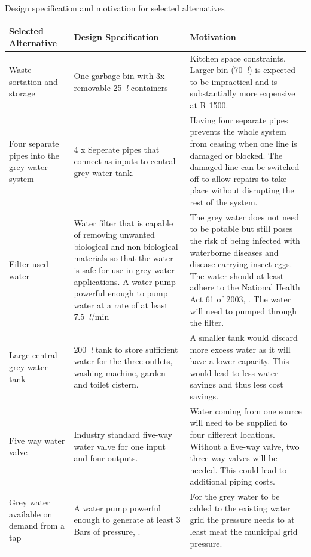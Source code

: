 \documentclass[a4paper,11pt,fleqn]{report}
\begin{document}
\begin{center}
\caption {Design specification and motivation for selected alternatives} \label{tb: Functional_design_specs} 
\begin{longtable}{p{3cm}|p{5.5cm}|p{5.5cm}}\toprule
	{\textbf{Selected Alternative}} & {\textbf{Design Specification}} & {\textbf{Motivation}}\\ \midrule
    \hline
    Waste sortation and storage & One garbage bin with 3x removable 25~\textit{l} containers & 
Kitchen space constraints. Larger bin (70~\textit{l}) is expected to be impractical and is substantially more expensive at R 1500.\\
        \hline
    Four separate pipes into the grey water system & 4 x Seperate pipes that connect as inputs to central grey water tank. & Having four separate pipes prevents the whole system from ceasing when one line is damaged or blocked. The damaged line can be switched off to allow repairs to take place without disrupting the rest of the system.\\
        \hline
    Filter used water & Water filter that is capable of removing unwanted biological and non biological materials so that the water is safe for use in grey water applications.
A water pump powerful enough to pump water at a rate of at least 7.5~\textit{l}/min
 & The grey water does not need to be potable but still poses the risk of being infected with waterborne diseases and disease carrying insect eggs. The water should at least adhere to the National Health Act 61 of 2003, \citep{NHA2003}.
The water will need to pumped through the filter.\\
        \hline
    Large central grey water tank & 200~\textit{l} tank to store sufficient water for the three outlets, washing machine, garden and toilet cistern. & A smaller tank would discard more excess water as it will have a lower capacity. This would lead to less water savings and thus less cost savings.\\
        \hline
    Five way water valve & Industry standard five-way water valve for one input and four outputs. & Water coming from one source will need to be supplied to four different locations. Without a five-way valve, two three-way valves will be needed. This could lead to additional piping costs.\\
            \hline
    Grey water available on demand from a tap & A water pump powerful enough to generate at least 3 Bars of pressure, \citep{Bran2016}. & For the grey water to be added to the existing water grid the pressure needs to at least meat the municipal grid pressure.\\

\end{longtable}
\end{center}
\end{document}
